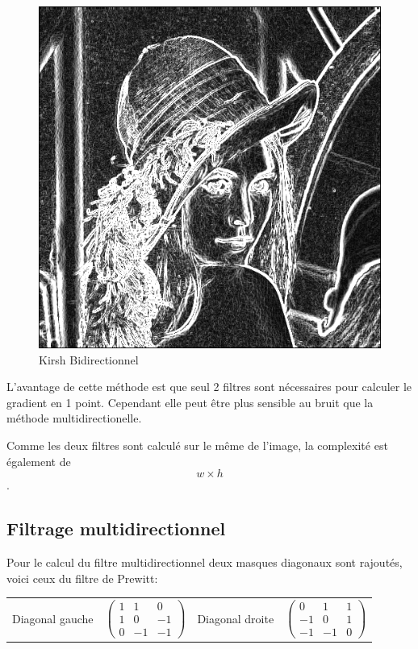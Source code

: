 \documentclass[11pt]{article}
\begin{document}
	\begin{figure}[H]
		\centering
		\includegraphics[scale=0.25]{Image/filtreKirshBidirectionnel.png}
		\caption{Kirsh Bidirectionnel}
		\label{fig:KirshBidirectionnel}
	\end{figure}

	L’avantage de cette méthode est que seul 2 filtres sont nécessaires pour calculer le gradient en 1 point. 
	Cependant elle peut être plus sensible au bruit que la méthode multidirectionelle.

	Comme les deux filtres sont calculé sur le même de l'image, la complexité est également de \[w \times h\].

	\subsection{Filtrage multidirectionnel}

	Pour le calcul du filtre multidirectionnel deux masques diagonaux sont rajoutés, voici ceux du filtre de Prewitt:
	\\
	\begin{tabular}{cccc}
		Diagonal gauche &
		$
		\begin{pmatrix}
			1 & 1 & 0 \\
			1 & 0 & -1 \\
			0 & -1 & -1
		\end{pmatrix}
		$
		& Diagonal droite &
		$
		\begin{pmatrix}
		0 & 1 & 1 \\
		-1 & 0 & 1 \\
		-1 & -1 & 0
		\end{pmatrix}
		$
	\end{tabular}
\end{document}
